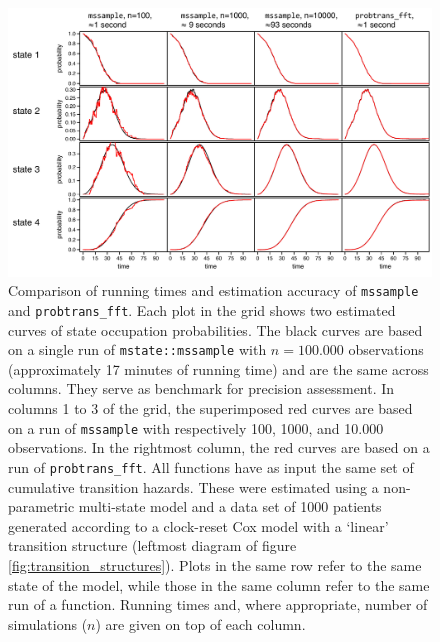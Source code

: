     \begin{figure}[h] 
    \centering         
    \includegraphics[width=13.5cm, angle=0]{figures/mssample_and_probtrans_fft.pdf} %
    \vspace*{0.25cm}     %
    \caption{Comparison of running times and estimation accuracy of \texttt{mssample} and \texttt{probtrans\_fft}. Each plot in the grid shows two estimated curves of state occupation probabilities. The black curves are based on a single run of \texttt{mstate::mssample} with $n=100.000$ observations (approximately 17 minutes of running time) and are the same across columns. They serve as benchmark for precision assessment. In columns 1 to 3 of the grid, the superimposed red curves are based on a run of \texttt{mssample} with respectively 100, 1000, and 10.000 observations. In the rightmost column,  the red curves are based on a run of \texttt{probtrans\_fft}. All functions have as input the same set of cumulative transition hazards. These were estimated using a non-parametric multi-state model and a data set of 1000 patients generated according to a clock-reset Cox model with a `linear' transition structure (leftmost diagram of figure \ref{fig:transition_structures}).  Plots in the same row refer to the same state of the model, while those in the same column refer to the same run of a function. Running times and, where appropriate, number of simulations ($n$) are given on top of each column.}
    \label{fig:mssample} %
    \end{figure} 
    
